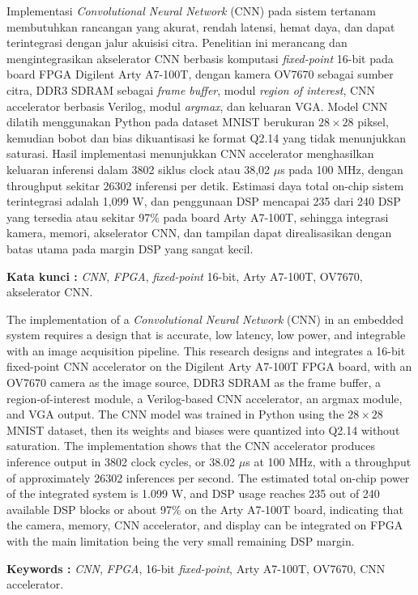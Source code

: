 \documentclass{jtetiskripsi}
\begin{document}
\begin{abstractind}
Implementasi \emph{Convolutional Neural Network} (CNN) pada sistem tertanam membutuhkan rancangan yang akurat, rendah latensi, hemat daya, dan dapat terintegrasi dengan jalur akuisisi citra. Penelitian ini merancang dan mengintegrasikan akselerator CNN berbasis komputasi \emph{fixed-point} 16-bit pada board FPGA Digilent Arty A7-100T, dengan kamera OV7670 sebagai sumber citra, DDR3 SDRAM sebagai \emph{frame buffer}, modul \emph{region of interest}, CNN accelerator berbasis Verilog, modul \emph{argmax}, dan keluaran VGA. Model CNN dilatih menggunakan Python pada dataset MNIST berukuran $28 \times 28$ piksel, kemudian bobot dan bias dikuantisasi ke format Q2.14 yang tidak menunjukkan saturasi. Hasil implementasi menunjukkan CNN accelerator menghasilkan keluaran inferensi dalam 3802 siklus clock atau 38,02 $\mu$s pada 100 MHz, dengan throughput sekitar 26302 inferensi per detik. Estimasi daya total on-chip sistem terintegrasi adalah 1,099 W, dan penggunaan DSP mencapai 235 dari 240 DSP yang tersedia atau sekitar 97\% pada board Arty A7-100T, sehingga integrasi kamera, memori, akselerator CNN, dan tampilan dapat direalisasikan dengan batas utama pada margin DSP yang sangat kecil.


\bigskip
\noindent
\textbf{Kata kunci :} \emph{CNN}, \emph{FPGA}, \emph{fixed-point} 16-bit, Arty A7-100T, OV7670, akselerator CNN.
\end{abstractind}

\begin{abstracteng}
The implementation of a \emph{Convolutional Neural Network} (CNN) in an embedded system requires a design that is accurate, low latency, low power, and integrable with an image acquisition pipeline. This research designs and integrates a 16-bit fixed-point CNN accelerator on the Digilent Arty A7-100T FPGA board, with an OV7670 camera as the image source, DDR3 SDRAM as the frame buffer, a region-of-interest module, a Verilog-based CNN accelerator, an argmax module, and VGA output. The CNN model was trained in Python using the $28 \times 28$ MNIST dataset, then its weights and biases were quantized into Q2.14 without saturation. The implementation shows that the CNN accelerator produces inference output in 3802 clock cycles, or 38.02 $\mu$s at 100 MHz, with a throughput of approximately 26302 inferences per second. The estimated total on-chip power of the integrated system is 1.099 W, and DSP usage reaches 235 out of 240 available DSP blocks or about 97\% on the Arty A7-100T board, indicating that the camera, memory, CNN accelerator, and display can be integrated on FPGA with the main limitation being the very small remaining DSP margin.

\bigskip
\noindent
\textbf{Keywords :} \emph{CNN}, \emph{FPGA}, 16-bit \emph{fixed-point}, Arty A7-100T, OV7670, CNN accelerator.
\end{abstracteng}
\end{document}
